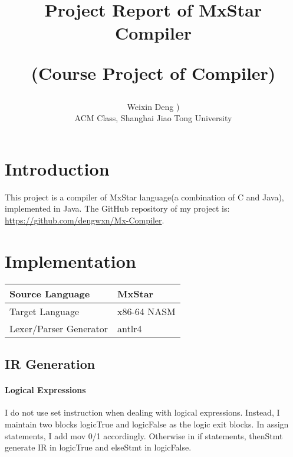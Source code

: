 \documentclass[12pt, a4paper]{article}
\newcommand{\upcite}[1]{\textsuperscript{\textsuperscript{\cite{#1}}}}
\begin{document}
\title{Project Report of MxStar Compiler\\\begin{large}(Course Project of Compiler)\end{large}}
\author{Weixin Deng {)}\\ACM Class, Shanghai Jiao Tong University}
\date{}

\maketitle

\section{Introduction}

This project is a compiler of MxStar\upcite{MxStar} language(a combination of C and Java), implemented in Java. The GitHub repository of my project is: \url{https://github.com/dengwxn/Mx-Compiler}.

\section{Implementation}

\begin{table}[!hbp]
	\centering
	\begin{tabular}{|l|l|}
	\hline
	Source Language        & MxStar      \\ \hline
	Target Language        & x86-64 NASM \\ \hline
	Lexer/Parser Generator & antlr4      \\ \hline
	\end{tabular}
\end{table}

\subsection{IR Generation}

\paragraph{Logical Expressions}
I do not use {\ttfamily set} instruction when dealing with logical expressions. Instead, I maintain two blocks {\ttfamily logicTrue} and {\ttfamily logicFalse} as the logic exit blocks. In {\ttfamily assign} statements, I add {\ttfamily mov 0/1} accordingly. Otherwise in {\ttfamily if} statements, {\ttfamily thenStmt} generate IR in {\ttfamily logicTrue} and    {\ttfamily elseStmt} in {\ttfamily logicFalse}.
\end{document}
